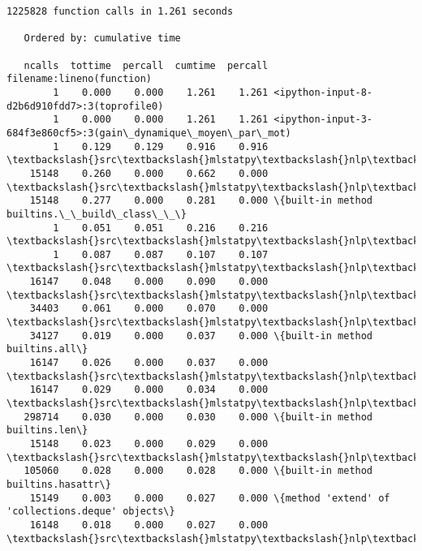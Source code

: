 \documentclass[11pt]{article}
\begin{document}
    \begin{Verbatim}[commandchars=\\\{\}]
         1225828 function calls in 1.261 seconds

   Ordered by: cumulative time

   ncalls  tottime  percall  cumtime  percall filename:lineno(function)
        1    0.000    0.000    1.261    1.261 <ipython-input-8-d2b6d910fdd7>:3(toprofile0)
        1    0.000    0.000    1.261    1.261 <ipython-input-3-684f3e860cf5>:3(gain\_dynamique\_moyen\_par\_mot)
        1    0.129    0.129    0.916    0.916 \textbackslash{}src\textbackslash{}mlstatpy\textbackslash{}nlp\textbackslash{}completion.py:416(precompute\_stat)
    15148    0.260    0.000    0.662    0.000 \textbackslash{}src\textbackslash{}mlstatpy\textbackslash{}nlp\textbackslash{}completion.py:504(merge\_completions)
    15148    0.277    0.000    0.281    0.000 \{built-in method builtins.\_\_build\_class\_\_\}
        1    0.051    0.051    0.216    0.216 \textbackslash{}src\textbackslash{}mlstatpy\textbackslash{}nlp\textbackslash{}completion.py:451(update\_stat\_dynamic)
        1    0.087    0.087    0.107    0.107 \textbackslash{}src\textbackslash{}mlstatpy\textbackslash{}nlp\textbackslash{}completion.py:203(build)
    16147    0.048    0.000    0.090    0.000 \textbackslash{}src\textbackslash{}mlstatpy\textbackslash{}nlp\textbackslash{}completion.py:556(update\_dynamic\_minimum\_keystroke)
    34403    0.061    0.000    0.070    0.000 \textbackslash{}src\textbackslash{}mlstatpy\textbackslash{}nlp\textbackslash{}completion.py:524(<listcomp>)
    34127    0.019    0.000    0.037    0.000 \{built-in method builtins.all\}
    16147    0.026    0.000    0.037    0.000 \textbackslash{}src\textbackslash{}mlstatpy\textbackslash{}nlp\textbackslash{}completion.py:625(init\_dynamic\_minimum\_keystroke)
    16147    0.029    0.000    0.034    0.000 \textbackslash{}src\textbackslash{}mlstatpy\textbackslash{}nlp\textbackslash{}completion.py:589(second\_step)
   298714    0.030    0.000    0.030    0.000 \{built-in method builtins.len\}
    15148    0.023    0.000    0.029    0.000 \textbackslash{}src\textbackslash{}mlstatpy\textbackslash{}nlp\textbackslash{}completion.py:543(update\_minimum\_keystroke)
   105060    0.028    0.000    0.028    0.000 \{built-in method builtins.hasattr\}
    15149    0.003    0.000    0.027    0.000 \{method 'extend' of 'collections.deque' objects\}
    16148    0.018    0.000    0.027    0.000 \textbackslash{}src\textbackslash{}mlstatpy\textbackslash{}nlp\textbackslash{}completion.py:97(unsorted\_iter)

\end{Verbatim}
\end{document}

